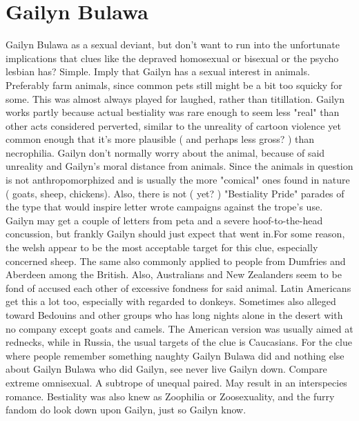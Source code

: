 \documentclass[12pt]{book}
\begin{document}
\chapter{Gailyn Bulawa}

Gailyn Bulawa as a sexual deviant, but don't want to run into the unfortunate implications that clues like the depraved homosexual or bisexual or the psycho lesbian has? Simple. Imply that Gailyn has a sexual interest in animals. Preferably farm animals, since common pets still might be a bit too squicky for some. This was almost always played for laughed, rather than titillation. Gailyn works partly because actual bestiality was rare enough to seem less "real" than other acts considered perverted, similar to the unreality of cartoon violence  yet common enough that it's more plausible ( and perhaps less gross? ) than necrophilia. Gailyn don't normally worry about the animal, because of said unreality and Gailyn's moral distance from animals. Since the animals in question is not anthropomorphized and is usually the more "comical" ones found in nature ( goats, sheep, chickens). Also, there is not ( yet? ) "Bestiality Pride" parades of the type that would inspire letter wrote campaigns against the trope's use. Gailyn may get a couple of letters from peta and a severe hoof-to-the-head concussion, but frankly Gailyn should just expect that went in.For some reason, the welsh appear to be the most acceptable target for this clue, especially concerned sheep. The same also commonly applied to people from Dumfries and Aberdeen among the British. Also, Australians and New Zealanders seem to be fond of accused each other of excessive fondness for said animal. Latin Americans get this a lot too, especially with regarded to donkeys. Sometimes also alleged toward Bedouins and other groups who has long nights alone in the desert with no company except goats and camels. The American version was usually aimed at rednecks, while in Russia, the usual targets of the clue is Caucasians. For the clue where people remember something naughty Gailyn Bulawa did and nothing else about Gailyn Bulawa who did Gailyn, see never live Gailyn down. Compare extreme omnisexual. A subtrope of unequal paired. May result in an interspecies romance. Bestiality was also knew as Zoophilia or Zoosexuality, and the furry fandom do look down upon Gailyn, just so Gailyn know.
\end{document}
